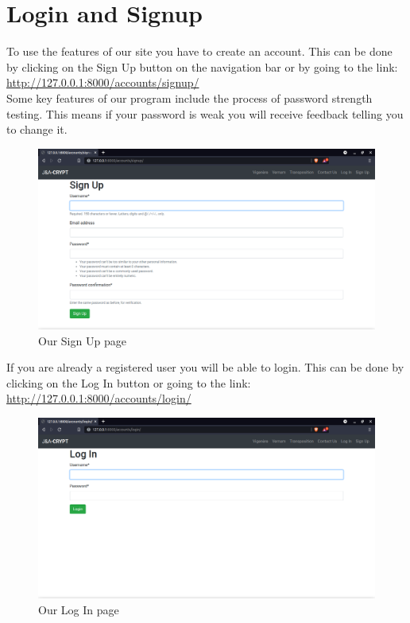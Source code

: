 \documentclass[a4paper, 12pt, titlepage]{report}
\begin{document}
\section{Login and Signup}
To use the features of our site you have to create an account. This can be done by clicking on the Sign Up button on the navigation bar or by going to the link:\\ \url{http://127.0.0.1:8000/accounts/signup/}\\
Some key features of our program include the process of password strength testing. This means if your password is weak you will receive feedback telling you to change it.
\begin{figure}[H]
\centering
\includegraphics[scale=0.3]{./pics/signup}
\caption{Our Sign Up page}
\end{figure}
\noindent If you are already a registered user you will be able to login. This can be done by clicking on the Log In button or going to the link:\\
\url{http://127.0.0.1:8000/accounts/login/}
\begin{figure}[H]
\centering
\includegraphics[scale=0.3]{./pics/login}
\caption{Our Log In page}
\end{figure}
\end{document}
